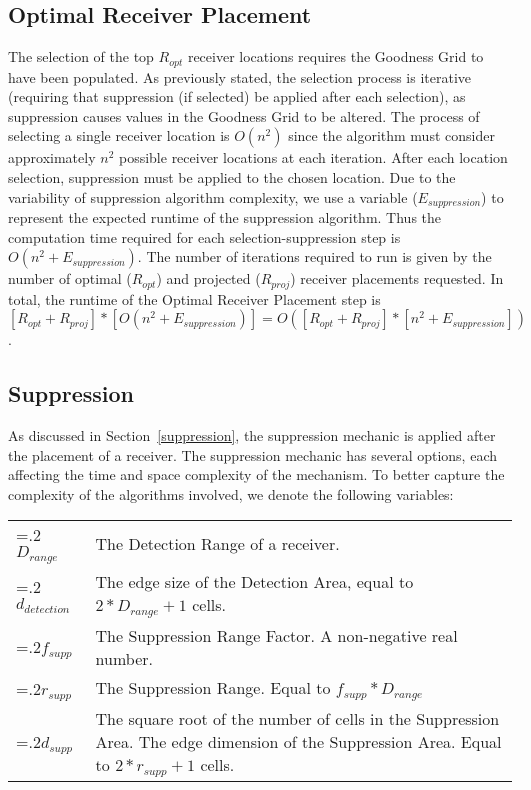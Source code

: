 \subsection{Optimal Receiver Placement}
The selection of the top $R_{opt}$ receiver locations requires the Goodness Grid to have been populated.  As previously stated, the selection process is iterative (requiring that suppression (if selected) be applied after each selection), as suppression causes values in the Goodness Grid to be altered.  The process of selecting a single receiver location is $O(n^2)$ since the algorithm must consider approximately $n^2$ possible receiver locations at each iteration.  After each location selection, suppression must be applied to the chosen location.  Due to the variability of suppression algorithm complexity, we use a variable  ($E_{suppression}$) to represent the expected runtime of the suppression algorithm.  Thus the computation time required for each selection-suppression step is $O(n^2 + E_{suppression})$.  The number of iterations required to run is given by the number of optimal ($R_{opt}$) and projected ($R_{proj}$) receiver placements requested.  In total, the runtime of the Optimal Receiver Placement step is $[R_{opt} + R_{proj}] * [O(n^2 + E_{suppression})] = O([R_{opt} + R_{proj}]* [n^2 + E_{suppression}])$.


\subsection{Suppression}
As discussed in Section~\ref{suppression}, the suppression mechanic is applied after the placement of a receiver.  The suppression mechanic has several options, each affecting the time and space complexity of the mechanism.  To better capture the complexity of the algorithms involved, we denote the following variables: \newline

\noindent\begin{tabularx}{\linewidth}{@{}>{\hsize=.2\hsize}X>{\hsize=1.5\hsize}X@{}}
	
$D_{range}$& The Detection Range of a receiver.\\
$d_{detection}$& The edge size of the Detection Area, equal to $2*D_{range}+1$ cells.\\
$f_{supp}$ & The Suppression Range Factor.  A non-negative real number.\\
$r_{supp}$ & The Suppression Range. Equal to $f_{supp}*D_{range}$\\
$d_{supp}$ & The square root of the number of cells in the Suppression Area.  The edge dimension of the Suppression Area.  Equal to $2*r_{supp} + 1$ cells.\\
\end{tabularx}

